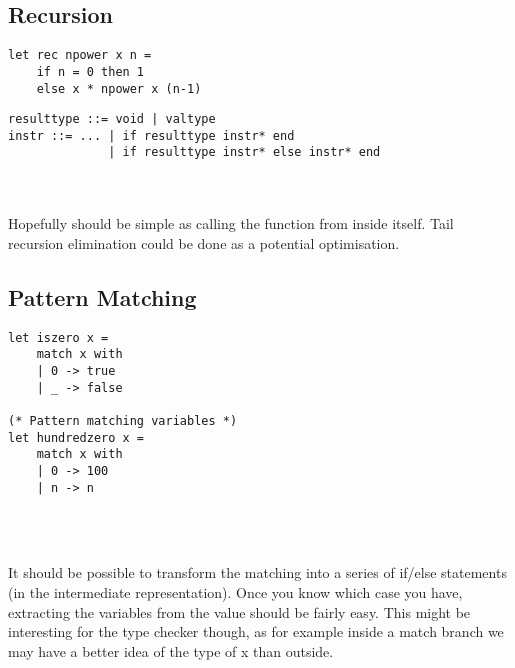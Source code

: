 \documentclass{article}
\begin{document}
\subsection{Recursion}
\begin{minipage}{0.4\linewidth}
\begin{verbatim}
let rec npower x n =
    if n = 0 then 1
    else x * npower x (n-1)
\end{verbatim}
\end{minipage}  
\begin{minipage}{0.6\linewidth}
\begin{verbatim}
resulttype ::= void | valtype
instr ::= ... | if resulttype instr* end
              | if resulttype instr* else instr* end
\end{verbatim}
\end{minipage}
\\\\
Hopefully should be simple as calling the function from inside itself. Tail recursion elimination could be done as a potential optimisation.

\subsection{Pattern Matching}
\begin{minipage}{0.4\linewidth}
\begin{verbatim}
let iszero x =
    match x with
    | 0 -> true
    | _ -> false

(* Pattern matching variables *)
let hundredzero x =
    match x with
    | 0 -> 100
    | n -> n
\end{verbatim}
\end{minipage}  
\begin{minipage}{0.6\linewidth}
\begin{verbatim}

\end{verbatim}
\end{minipage}
\\\\
It should be possible to transform the matching into a series of if/else statements (in the intermediate representation). Once you know which case you have, extracting the variables from the value should be fairly easy. This might be interesting for the type checker though, as for example inside a match branch we may have a better idea of the type of x than outside.
\end{document}

